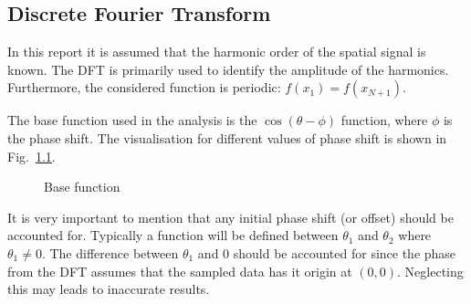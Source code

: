 \begin{appendices}

\chapter{Discrete Fourier Transform}
In this report it is assumed that the harmonic order of the spatial signal is known. The DFT is primarily used to identify the amplitude of the harmonics. Furthermore, the considered function is periodic: $f(x_1)=f(x_{N+1})$.

The base function used in the analysis is the $\cos(\theta-\phi)$ function, where $\phi$ is the phase shift. The visualisation for different values of phase shift is shown in Fig.~\ref{fig:base}.  

\begin{figure}[htbp]
  \centering
  \fontsize{6}{0}\selectfont
  \setlength{}
  \hfill
  \subfloat[$\cos(\theta)$]{
  }
  \hfill
  \caption{Base function}
  \label{fig:base}
\end{figure}

It is very important to mention that any initial phase shift (or offset) should be accounted for. Typically a function will be defined between $\theta_1$ and $\theta_2$ where $\theta_1\neq 0$. The difference between $\theta_1$ and $0$ should be accounted for since the phase from the DFT assumes that the sampled data has it origin at $(0,0)$. Neglecting this may leads to inaccurate results. 


\end{appendices}
